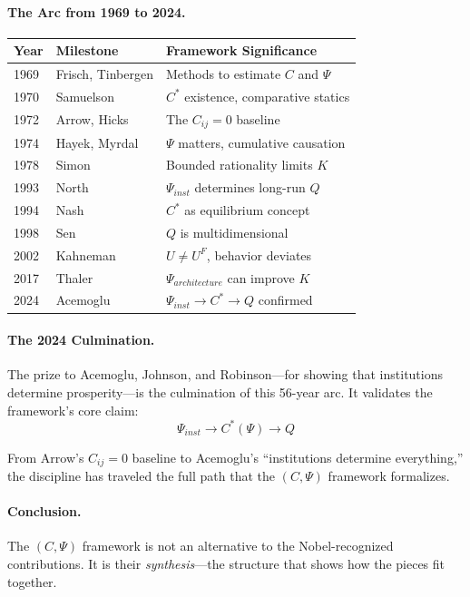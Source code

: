 \paragraph{The Arc from 1969 to 2024.}
\begin{center}
\renewcommand{\arraystretch}{1.2}
\begin{tabular}{lll}
\hline
\textbf{Year} & \textbf{Milestone} & \textbf{Framework Significance} \\
\hline
1969 & Frisch, Tinbergen & Methods to estimate $C$ and $\Psi$ \\
1970 & Samuelson & $C^*$ existence, comparative statics \\
1972 & Arrow, Hicks & The $C_{ij} = 0$ baseline \\
1974 & Hayek, Myrdal & $\Psi$ matters, cumulative causation \\
1978 & Simon & Bounded rationality limits $K$ \\
1993 & North & $\Psi_{inst}$ determines long-run $Q$ \\
1994 & Nash & $C^*$ as equilibrium concept \\
1998 & Sen & $Q$ is multidimensional \\
2002 & Kahneman & $U \neq U^F$, behavior deviates \\
2017 & Thaler & $\Psi_{architecture}$ can improve $K$ \\
2024 & Acemoglu & $\Psi_{inst} \to C^* \to Q$ confirmed \\
\hline
\end{tabular}
\end{center}

\paragraph{The 2024 Culmination.}
The prize to Acemoglu, Johnson, and Robinson---for showing that institutions
determine prosperity---is the culmination of this 56-year arc. It validates
the framework's core claim:
\begin{equation}
  \Psi_{inst} \to C^*(\Psi) \to Q
\end{equation}

From Arrow's $C_{ij} = 0$ baseline to Acemoglu's ``institutions determine everything,''
the discipline has traveled the full path that the $(C, \Psi)$ framework formalizes.

\paragraph{Conclusion.}
The $(C, \Psi)$ framework is not an alternative to the Nobel-recognized contributions.
It is their \emph{synthesis}---the structure that shows how the pieces fit together.

